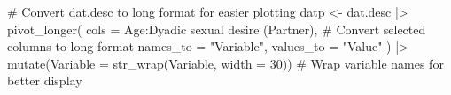 \documentclass[
  bookmarksnumbered]{article}
\newenvironment{Shaded}{\begin{snugshade}}{\end{snugshade}}
\newcommand{\AttributeTok}[1]{\textcolor[rgb]{0.80,0.80,0.80}{#1}}
\newcommand{\CommentTok}[1]{\textcolor[rgb]{0.50,0.62,0.50}{#1}}
\newcommand{\DecValTok}[1]{\textcolor[rgb]{0.86,0.86,0.80}{#1}}
\newcommand{\FunctionTok}[1]{\textcolor[rgb]{0.94,0.94,0.56}{#1}}
\newcommand{\NormalTok}[1]{\textcolor[rgb]{0.80,0.80,0.80}{#1}}
\newcommand{\OtherTok}[1]{\textcolor[rgb]{0.94,0.94,0.56}{#1}}
\newcommand{\SpecialCharTok}[1]{\textcolor[rgb]{0.86,0.64,0.64}{#1}}
\newcommand{\StringTok}[1]{\textcolor[rgb]{0.80,0.58,0.58}{#1}}
\begin{document}
\begin{Shaded}
\begin{Highlighting}[]
\CommentTok{\# Convert dat.desc to long format for easier plotting}
\NormalTok{datp }\OtherTok{\textless{}{-}}\NormalTok{ dat.desc }\SpecialCharTok{|\textgreater{}}
  \FunctionTok{pivot\_longer}\NormalTok{(}
    \AttributeTok{cols =}\NormalTok{ Age}\SpecialCharTok{:}\StringTok{\textasciigrave{}}\AttributeTok{Dyadic sexual desire (Partner)}\StringTok{\textasciigrave{}}\NormalTok{, }\CommentTok{\# Convert selected columns to long format}
    \AttributeTok{names\_to =} \StringTok{"Variable"}\NormalTok{, }\AttributeTok{values\_to =} \StringTok{"Value"}
\NormalTok{  ) }\SpecialCharTok{|\textgreater{}}
  \FunctionTok{mutate}\NormalTok{(}\AttributeTok{Variable =} \FunctionTok{str\_wrap}\NormalTok{(Variable, }\AttributeTok{width =} \DecValTok{30}\NormalTok{)) }\CommentTok{\# Wrap variable names for better display}


\end{Highlighting}
\end{Shaded}
\end{document}
